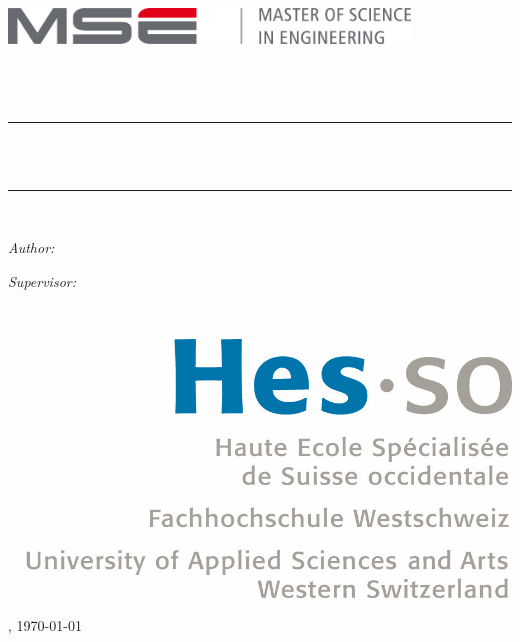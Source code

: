 \documentclass[a4paper,11pt]{report}
\newcommand{\HRule}{\rule{\linewidth}{0.5mm}}
\begin{document}
\begin{titlepage}
    \begin{center}

        \includegraphics[width=0.8\textwidth]{img/mse_logo}~\\[1.5cm]
        \textsc{\Large \School}\\[0.25cm]
        \textsc{\Large \Faculty}\\[1.5cm]
        \textsc{\LARGE \Course}\\[0.5cm]

        \HRule \\[0.4cm]
        { \huge \bfseries \Title\\[0.4cm] }
        \HRule \\[1.5cm]

        \begin{minipage}[t]{0.4\textwidth}
            \begin{flushleft} \Large
                \emph{Author:}\\ \Authors
            \end{flushleft}
        \end{minipage}
        \begin{minipage}[t]{0.4\textwidth}
            \begin{flushright} \Large
                \emph{Supervisor:}\\\Supervisors
            \end{flushright}
        \end{minipage}~\\[1.5cm]

        \begin{center}
            \includegraphics[scale=0.7]{img/logo_hes-so}
        \end{center}

        \vfill

        {\large \Place, \today}

    \end{center}
\end{titlepage}
\end{document}
